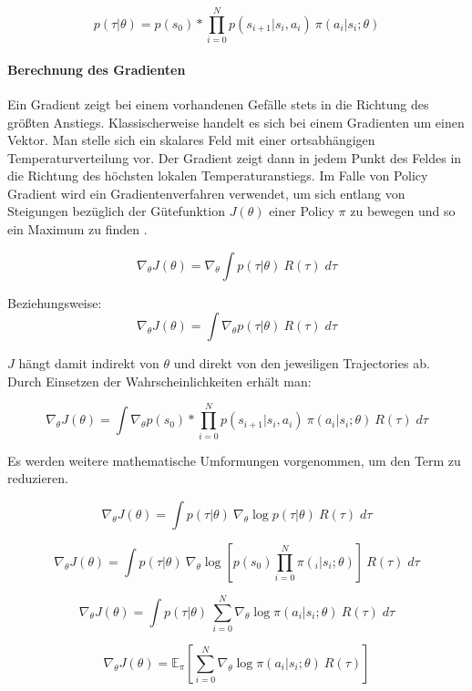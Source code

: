 $$  p(\tau|\theta)   =   p(s_0) * \prod_{i=0}^N   p(s_{i+1}|s_i,a_i)  \:  \pi(a_i|s_i;\theta)      $$





\paragraph{Berechnung des Gradienten}
Ein Gradient zeigt bei einem vorhandenen Gefälle stets in die Richtung des größten Anstiegs. Klassischerweise handelt es sich bei einem Gradienten um einen Vektor. Man stelle sich ein skalares Feld mit einer ortsabhängigen Temperaturverteilung vor. Der Gradient zeigt dann in jedem Punkt des Feldes in die Richtung des höchsten lokalen Temperaturanstiegs. Im Falle von Policy Gradient wird ein Gradientenverfahren verwendet, um sich entlang von Steigungen bezüglich der Gütefunktion $J(\theta)$ einer Policy $\pi$ zu bewegen und so ein Maximum zu finden \cite{tds_policygradient} \cite{reinforcement_introduction_book}.

$$  \nabla_{\theta} J(\theta)  =   \nabla_{\theta}  \int p(\tau|\theta) \: R(\tau) \; d\tau    $$

Beziehungsweise:    $$  \nabla_{\theta} J(\theta)  =  \int \nabla_{\theta} p(\tau|\theta) \: R(\tau) \; d\tau    $$

$J$ hängt damit indirekt von $\theta$ und direkt von den jeweiligen Trajectories ab. Durch Einsetzen der Wahrscheinlichkeiten erhält man:

$$  \nabla_{\theta} J(\theta)  =  \int \nabla_{\theta} p(s_0) * \prod_{i=0}^N   p(s_{i+1}|s_i,a_i)  \:  \pi(a_i|s_i;\theta) \: R(\tau) \; d\tau    $$

Es werden weitere mathematische Umformungen vorgenommen, um den Term zu reduzieren.

$$  \nabla_{\theta} J(\theta)  =  \int  p(\tau|\theta) \: \nabla_{\theta}  \log p(\tau|\theta) \: R(\tau) \; d\tau    $$


$$  \nabla_{\theta} J(\theta)  =  \int  p(\tau|\theta) \: \nabla_{\theta}  \log \left[ p(s_0) \prod_{i=0}^N  \pi(_i|s_i;\theta) \right]    \: R(\tau) \; d\tau   $$


$$  \nabla_{\theta} J(\theta)  =  \int  p(\tau|\theta) \:  \sum_{i=0}^N   \nabla_{\theta}   \log \pi(a_i|s_i;\theta)  \: R(\tau) \; d\tau $$


$$  \nabla_{\theta} J(\theta)  =   \mathbb{E}_{\pi}   \left[  \sum_{i=0}^N   \nabla_{\theta}   \log \pi(a_i|s_i;\theta)  \: R(\tau)  \right]   $$



